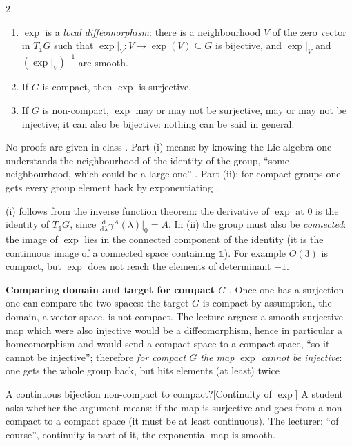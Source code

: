 \begin{paracol}{2}
\begin{theorem}
\begin{enumerate}
  \item[(i)] $\exp$ is a \emph{local diffeomorphism}: there is a neighbourhood $V$ of the zero vector in $T_{\mathbb 1}G$ such that $\exp|_V\colon V\to\exp(V)\subseteq G$ is bijective, and $\exp|_V$ and $(\exp|_V)^{-1}$ are smooth.
  \item[(ii)] If $G$ is compact, then $\exp$ is surjective.
  \item[(iii)] If $G$ is non-compact, $\exp$ may or may not be surjective, may or may not be injective; it can also be bijective: nothing can be said in general.
\end{enumerate}
\end{theorem}
No proofs are given in class    . Part (i) means: by knowing the Lie algebra one understands the neighbourhood of the identity of the group, ``some neighbourhood, which could be a large one'' . Part (ii): for compact groups one gets every group element back by exponentiating  .
\begin{coursenote}
(i) follows from the inverse function theorem: the derivative of $\exp$ at $0$ is the identity of $T_{\mathbb 1}G$, since $\frac{\mathrm d}{\mathrm d\lambda}\gamma^A(\lambda)|_0=A$. In (ii) the group must also be \emph{connected}: the image of $\exp$ lies in the connected component of the identity (it is the continuous image of a connected space containing $\mathbb 1$). For example $O(3)$ is compact, but $\exp$ does not reach the elements of determinant $-1$. 
\end{coursenote}
\textbf{Comparing domain and target for compact $G$} . Once one has a surjection one can compare the two spaces: the target $G$ is compact by assumption, the domain, a vector space, is not compact. The lecture argues: a smooth surjective map which were also injective would be a diffeomorphism, hence in particular a homeomorphism and would send a compact space to a compact space, ``so it cannot be injective''; therefore \emph{for compact $G$ the map $\exp$ cannot be injective}: one gets the whole group back, but hits elements (at least) twice     .
\begin{answer}{A continuous bijection non-compact to compact?}[Continuity of $\exp$]
A student asks whether the argument means: if the map is surjective and goes from a non-compact to a compact space (it must be at least continuous). The lecturer: ``of course'', continuity is part of it, the exponential map is smooth. 

\end{answer}
\end{paracol}

